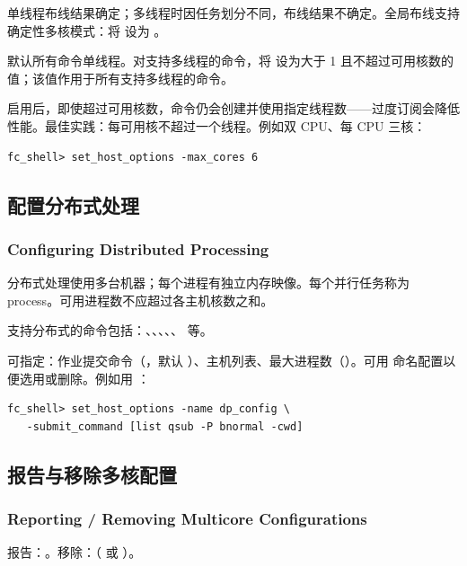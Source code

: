 \begin{noteBox}
单线程布线结果确定；多线程时因任务划分不同，布线结果不确定。全局布线支持确定性多核模式：将  设为 。
\end{noteBox}

默认所有命令单线程。对支持多线程的命令，将  设为大于 1 且不超过可用核数的值；该值作用于所有支持多线程的命令。

启用后，即使超过可用核数，命令仍会创建并使用指定线程数——过度订阅会降低性能。最佳实践：每可用核不超过一个线程。例如双 CPU、每 CPU 三核：
\begin{lstlisting}
fc_shell> set_host_options -max_cores 6
\end{lstlisting}

\subsection{配置分布式处理}
\subsubsection*{Configuring Distributed Processing}

分布式处理使用多台机器；每个进程有独立内存映像。每个并行任务称为 process。可用进程数不应超过各主机核数之和。

支持分布式的命令包括：、、、、、 等。

可指定：作业提交命令（，默认 ）、主机列表、最大进程数（）。可用  命名配置以便选用或删除。例如用 ：
\begin{lstlisting}
fc_shell> set_host_options -name dp_config \
   -submit_command [list qsub -P bnormal -cwd]
\end{lstlisting}

\subsection{报告与移除多核配置}
\subsubsection*{Reporting / Removing Multicore Configurations}

报告：。移除：（ 或 ）。

